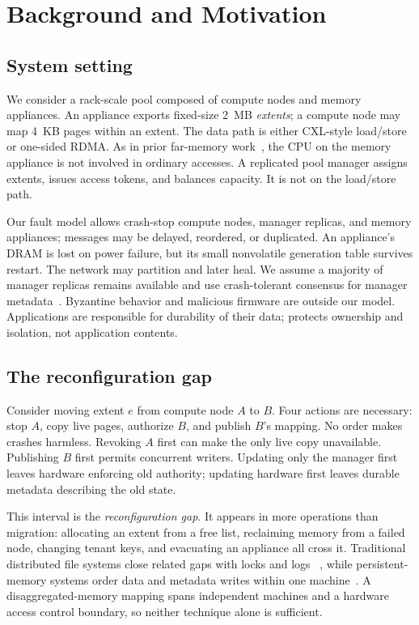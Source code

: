 \section{Background and Motivation}
\label{sec:background}

\subsection{System setting}

We consider a rack-scale pool composed of compute nodes and memory appliances.
An appliance exports fixed-size 2~MB \emph{extents}; a compute node may map
4~KB pages within an extent. The data path is either CXL-style load/store or
one-sided RDMA. As in prior far-memory work~\cite{aguilera2018remote,
amaro2020fastswap}, the CPU on the memory appliance is not involved in ordinary
accesses. A replicated pool manager assigns extents, issues access tokens, and
balances capacity. It is not on the load/store path.

Our fault model allows crash-stop compute nodes, manager replicas, and memory
appliances; messages may be delayed, reordered, or duplicated. An appliance's
DRAM is lost on power failure, but its small nonvolatile generation table
survives restart. The network may partition and later heal. We assume a
majority of manager replicas remains available and use crash-tolerant consensus
for manager metadata~\cite{ongaro2014raft}. Byzantine behavior and malicious
firmware are outside our model. Applications are responsible for durability of
their data; \system protects ownership and isolation, not application contents.

\subsection{The reconfiguration gap}

Consider moving extent $e$ from compute node $A$ to $B$. Four actions are
necessary: stop $A$, copy live pages, authorize $B$, and publish $B$'s mapping.
No order makes crashes harmless. Revoking $A$ first can make the only live copy
unavailable. Publishing $B$ first permits concurrent writers. Updating only
the manager first leaves hardware enforcing old authority; updating hardware
first leaves durable metadata describing the old state.

This interval is the \emph{reconfiguration gap}. It appears in more operations
than migration: allocating an extent from a free list, reclaiming memory from a
failed node, changing tenant keys, and evacuating an appliance all cross it.
Traditional distributed file systems close related gaps with locks and logs
~\cite{thekkath1997frangipani}, while persistent-memory systems order data and
metadata writes within one machine~\cite{volos2011mnemosyne,xu2016nova}. A
disaggregated-memory mapping spans independent machines and a hardware access
control boundary, so neither technique alone is sufficient.

